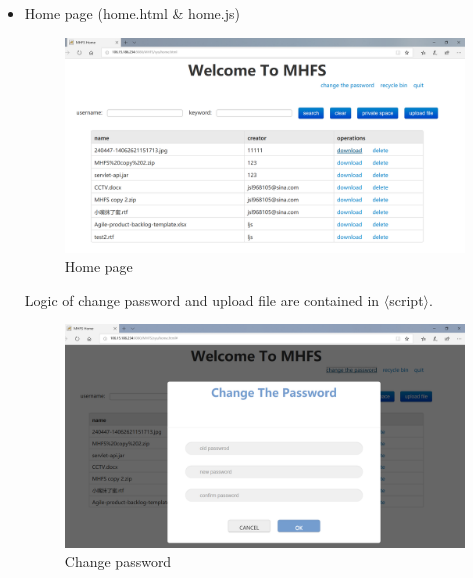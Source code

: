 \documentclass[a4paper,11pt]{article}
\begin{document}
\begin{itemize}
\item Home page (home.html \& home.js)
\begin{figure}[ht]
    \centering
    \includegraphics[scale=0.3]{2p.png}
    \caption{Home page}
    \label{fig:Home page}
\end{figure}

\par Logic of change password and upload file are contained in {$\langle$}script{$\rangle$}.

\begin{figure}[ht]
    \centering
    \includegraphics[scale=0.3]{3p.png}
    \caption{Change password}
    \label{fig:Change password}
\end{figure}


\end{itemize}
\end{document}
